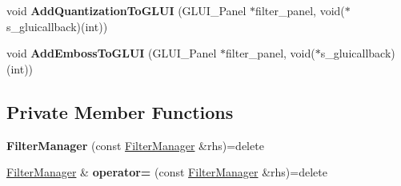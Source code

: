 \begin{DoxyCompactItemize}
\item 
void {\bfseries Add\+Quantization\+To\+G\+L\+UI} (G\+L\+U\+I\+\_\+\+Panel $\ast$filter\+\_\+panel, void($\ast$s\+\_\+gluicallback)(int))\hypertarget{classimage__tools_1_1FilterManager_ae13d0c9858da16b283bdf71ee2b4ad8f}{}\label{classimage__tools_1_1FilterManager_ae13d0c9858da16b283bdf71ee2b4ad8f}

\item 
void {\bfseries Add\+Emboss\+To\+G\+L\+UI} (G\+L\+U\+I\+\_\+\+Panel $\ast$filter\+\_\+panel, void($\ast$s\+\_\+gluicallback)(int))\hypertarget{classimage__tools_1_1FilterManager_a810b6ba71bc888b34d4f7656c21f8e98}{}\label{classimage__tools_1_1FilterManager_a810b6ba71bc888b34d4f7656c21f8e98}

\end{DoxyCompactItemize}
\subsection*{Private Member Functions}
\begin{DoxyCompactItemize}
\item 
{\bfseries Filter\+Manager} (const \hyperlink{classimage__tools_1_1FilterManager}{Filter\+Manager} \&rhs)=delete\hypertarget{classimage__tools_1_1FilterManager_a0ba8533dfc092d8a8329c60ba2691625}{}\label{classimage__tools_1_1FilterManager_a0ba8533dfc092d8a8329c60ba2691625}

\item 
\hyperlink{classimage__tools_1_1FilterManager}{Filter\+Manager} \& {\bfseries operator=} (const \hyperlink{classimage__tools_1_1FilterManager}{Filter\+Manager} \&rhs)=delete\hypertarget{classimage__tools_1_1FilterManager_a56e520b2bd12c3f7c46af9bb0381ade0}{}\label{classimage__tools_1_1FilterManager_a56e520b2bd12c3f7c46af9bb0381ade0}

\end{DoxyCompactItemize}
